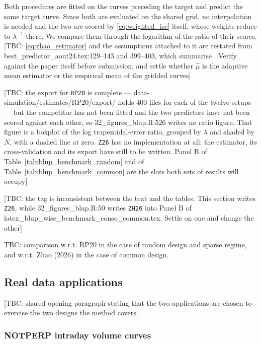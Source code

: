 Both procedures are fitted on the curves preceding the target and predict the same target curve. Since both are evaluated on the shared grid, no interpolation is needed and the two are scored by \eqref{eq:weighted_ise} itself, whose weights reduce to $\lambda^{-1}$ there. We compare them through the logarithm of the ratio of their scores.
[TBC: \eqref{eq:zhao_estimator} and the assumptions attached to it are restated from best\_predictor\_aout24.tex:129--143 and 399--403, which summarise \citet{zhao2026functional}. Verify against the paper itself before submission, and settle whether $\widehat\mu$ is the adaptive mean estimator or the empirical mean of the gridded curves]

[TBC: the export for \texttt{RP20} is complete --- data-simulation/estimates/RP20/export/ holds $400$ files for each of the twelve setups --- but the competitor has not been fitted and the two predictors have not been scored against each other, so 32\_figures\_blup.R:526 writes no ratio figure. That figure is a boxplot of the log trapezoidal-error ratio, grouped by $\lambda$ and shaded by $N$, with a dashed line at zero. \texttt{Z26} has no implementation at all: the estimator, its cross-validation and its export have still to be written. Panel B of Table~\ref{tab:blup_benchmark_random} and of Table~\ref{tab:blup_benchmark_common} are the slots both sets of results will occupy]

[TBC: the tag is inconsistent between the text and the tables. This section writes \texttt{Z26}, while 32\_figures\_blup.R:50 writes \texttt{ZH26} into Panel B of latex\_blup\_wise\_benchmark\_conso\_common.tex. Settle on one and change the other]
\color{black}

\color{magenta}TBC: comparison w.r.t. RP20 in the case of random design and sparse regime, and w.r.t. Zhao (2026) in the case of common design.\color{black}

\subsection{Real data applications}\label{sec:num:realdata}

\color{magenta}
[TBC: shared opening paragraph stating that the two applications are chosen to exercise the two designs the method covers]
\color{black}

\subsubsection{\color{magenta}NOTPERP intraday volume curves\color{black}}

